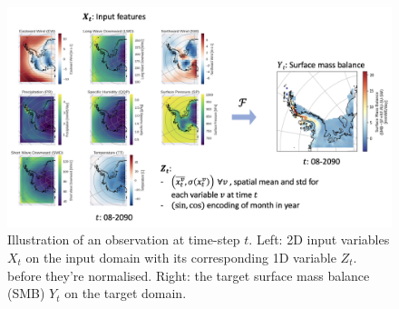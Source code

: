 \documentclass[a4paper,11pt,oneside]{report}
\begin{document}
\begin{figure}[!t]
  \centering
  \includegraphics[width=\columnwidth]{images/data_example.png}
  \caption []{\small Illustration of an observation at time-step $t$. Left: 2D input variables $X_t$ on the input domain with its corresponding 1D variable $Z_t$. before they're normalised. Right: the target surface mass balance (SMB) $Y_t$ on the target domain.}
  \vspace{-3mm}
  \label{fig:example-features}
\end{figure}
\end{document}
